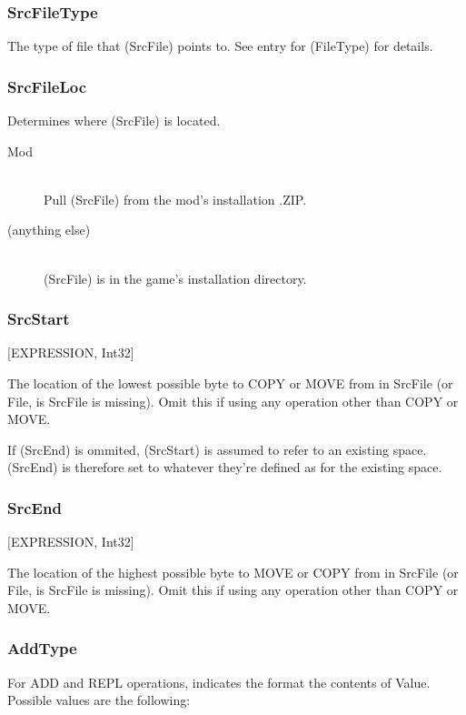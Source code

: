 \documentclass[12pt,a4paper,notitlepage]{article}
\begin{document}
\subsubsection{SrcFileType}
The type of file that (SrcFile) points to. See entry for (FileType) for details.

\subsubsection{SrcFileLoc}
Determines where (SrcFile) is located.

\begin{description}
\item[Mod] \hfill \\ 
    Pull (SrcFile) from the mod's installation .ZIP.
\item[(anything else)] \hfill \\
    (SrcFile) is in the game's installation directory.
\end{description}

\subsubsection{SrcStart}
[EXPRESSION, Int32]

The location of the lowest possible byte to COPY or MOVE from in SrcFile (or File, is SrcFile is missing). Omit this if using any operation other than COPY or MOVE.

If (SrcEnd) is ommited, (SrcStart) is assumed to refer to an existing space. (SrcEnd) is therefore set to whatever they're defined as for the existing space.

\subsubsection{SrcEnd}
[EXPRESSION, Int32]

The location of the highest possible byte to MOVE or COPY from in SrcFile (or File, is SrcFile is missing). Omit this if using any operation other than COPY or MOVE.

\subsubsection{AddType}
For ADD and REPL operations, indicates the format the contents of Value. Possible values are the following:
\end{document}
